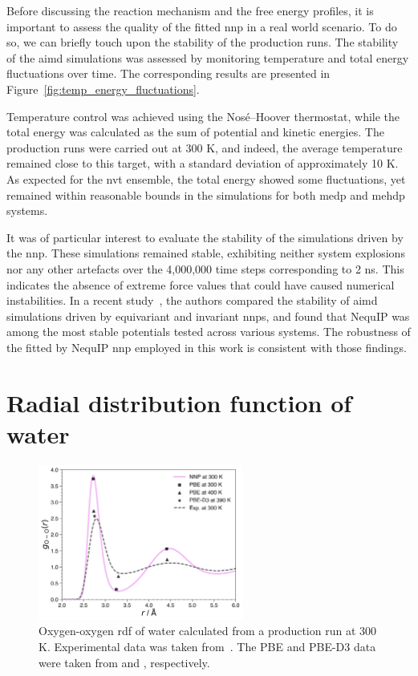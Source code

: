 Before discussing the reaction mechanism and the free energy profiles, it is important to assess the quality of the fitted \ac{nnp} in a real world scenario. To do so, we can briefly touch upon the stability of the production runs. The stability of the \ac{aimd} simulations was assessed by monitoring temperature and total energy fluctuations over time. The corresponding results are presented in Figure~\ref{fig:temp_energy_fluctuations}.

Temperature control was achieved using the Nos\'e--Hoover thermostat, while the total energy was calculated as the sum of potential and kinetic energies. The production runs were carried out at 300 K, and indeed, the average temperature remained close to this target, with a standard deviation of approximately 10 K. As expected for the \ac{nvt} ensemble, the total energy showed some fluctuations, yet remained within reasonable bounds in the simulations for both \ac{medp} and \ac{mehdp} systems.

It was of particular interest to evaluate the stability of the simulations driven by the \ac{nnp}. These simulations remained stable, exhibiting neither system explosions nor any other artefacts over the 4,000,000 time steps corresponding to 2 ns. This indicates the absence of extreme force values that could have caused numerical instabilities. In a recent study~\citep{fuForcesAreNot2023}, the authors compared the stability of \ac{aimd} simulations driven by equivariant and invariant \acp{nnp}, and found that NequIP was among the most stable potentials tested across various systems. The robustness of the fitted by NequIP \ac{nnp} employed in this work is consistent with those findings.



\section{Radial distribution function of water}

\begin{figure}[b!]
    \centering
    \includegraphics[width=0.6\textwidth]{Figures/4_Results/results_water_rdf.png}
    \caption{Oxygen-oxygen \ac{rdf} of water calculated from a production run at 300 K. Experimental data was taken from~\citep{soperRadialDistributionFunctions2013}. The PBE and PBE-D3 data were taken from \citep{phamStructureDynamicsAqueous2016} and \citep{zhouQuantifyingStructureWater2022}, respectively.}
    \label{fig:water_rdf}
\end{figure}

